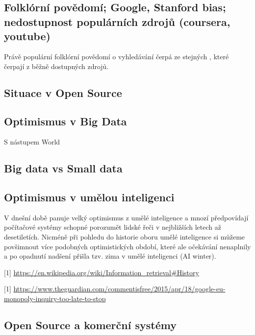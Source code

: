 \documentclass[11pt]{article}
\begin{document}
\subsection{Folklórní povědomí; Google, Stanford bias; nedostupnost populárních zdrojů (coursera, youtube)}
Právě populární folklórní povědomí o vyhledávání čerpá ze stejných , které čerpají
z běžně dostupných zdrojů.

\subsection{Situace v Open Source}
\subsection{Optimismus v Big Data}
S nástupem World 

\subsection{Big data vs Small data}


\subsection{Optimismus v umělou inteligenci}
V dnešní době panuje velký optimismus z umělé inteligence a mnozí
předpovídají počítačové systémy schopné porozumět lidské řeči v
nejbližších letech až desetiletích. Nicméně při pohledu do historie
oboru umělé inteligence si můžeme povšimnout více podobných
optimistických období, které ale očekávání nenaplnily a po opadnutí
nadšení přišla tzv. zima v umělé inteligenci (AI winter). 



[1] \url{https://en.wikipedia.org/wiki/Information_retrieval#History}


[1] \url{https://www.theguardian.com/commentisfree/2015/apr/18/google-eu-monopoly-inquiry-too-late-to-stop}

\subsection{Open Source a komerční systémy}
\end{document}
